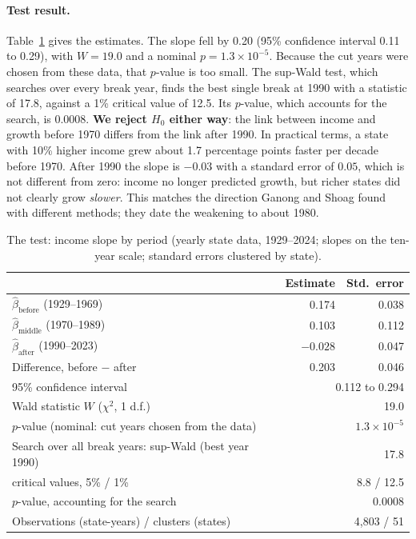\documentclass[11pt]{article}
\begin{document}
\paragraph{Test result.} Table~\ref{tab:test} gives the estimates. The slope fell by 0.20 (95\%
confidence interval 0.11 to 0.29), with $W = 19.0$ and a nominal $p = 1.3 \times 10^{-5}$. Because
the cut years were chosen from these data, that $p$-value is too small. The sup-Wald test, which
searches over every break year, finds the best single break at 1990 with a statistic of 17.8,
against a 1\% critical value of 12.5. Its $p$-value, which accounts for the search, is 0.0008.
\textbf{We reject $H_0$ either way}: the link between income and growth before 1970 differs from the
link after 1990. In practical terms, a state with 10\% higher income grew about 1.7 percentage points
faster per decade before 1970. After 1990 the slope is $-0.03$ with a standard error of $0.05$, which
is not different from zero: income no longer predicted growth, but richer states did not clearly
grow \emph{slower}. This matches the direction Ganong and Shoag \cite{ganong} found with different
methods; they date the weakening to about 1980.

\begin{table}[htbp]
\centering\small
\caption{The test: income slope by period (yearly state data, 1929--2024; slopes on the
ten-year scale; standard errors clustered by state).}
\label{tab:test}
\begin{tabular}{lrr}
\toprule
& Estimate & Std.\ error \\
\midrule
$\hat\beta_{\text{before}}$ (1929--1969) & 0.174 & 0.038 \\
$\hat\beta_{\text{middle}}$ (1970--1989) & 0.103 & 0.112 \\
$\hat\beta_{\text{after}}$ (1990--2023)  & $-0.028$ & 0.047 \\
\midrule
Difference, before $-$ after & 0.203 & 0.046 \\
95\% confidence interval & \multicolumn{2}{r}{0.112 to 0.294} \\
Wald statistic $W$ ($\chi^2$, 1 d.f.) & \multicolumn{2}{r}{19.0} \\
$p$-value (nominal: cut years chosen from the data) & \multicolumn{2}{r}{$1.3\times10^{-5}$} \\
\midrule
Search over all break years: sup-Wald (best year 1990) & \multicolumn{2}{r}{17.8} \\
\quad critical values, 5\% / 1\% & \multicolumn{2}{r}{8.8 / 12.5} \\
\quad $p$-value, accounting for the search & \multicolumn{2}{r}{0.0008} \\
\midrule
Observations (state-years) / clusters (states) & \multicolumn{2}{r}{4,803 / 51} \\
\bottomrule
\end{tabular}
\end{table}
\end{document}
